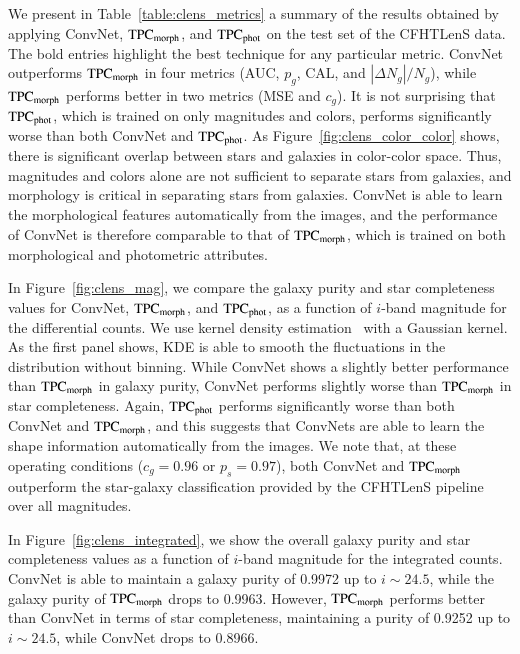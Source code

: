 \documentclass[fleqn,usenatbib]{mnras}
\begin{document}
We present in Table~\ref{table:clens_metrics} a summary of the results obtained
by applying ConvNet, ${\mathrm{TPC}}_{{\mathrm{morph}}}$, and ${\mathrm{TPC}}_{{\mathrm{phot}}}$
on the test set of the CFHTLenS data.
The bold entries highlight the best technique for any particular metric.
ConvNet outperforms ${\mathrm{TPC}}_{{\mathrm{morph}}}$ in four metrics (AUC, $p_g$, CAL,
and $|\Delta N_g|/N_g$), while ${\mathrm{TPC}}_{{\mathrm{morph}}}$ performs better in
two metrics (MSE and $c_g$).
It is not surprising that ${\mathrm{TPC}}_{{\mathrm{phot}}}$, which is trained on only
magnitudes and colors, performs significantly worse than both ConvNet and
${\mathrm{TPC}}_{{\mathrm{phot}}}$.
As Figure~\ref{fig:clens_color_color} shows, there is significant overlap
between stars and galaxies in color-color space.
Thus, magnitudes and colors alone are not sufficient to separate stars from
galaxies,
and morphology is critical in separating stars from galaxies.
ConvNet is able to learn the morphological features automatically from
the images, and the performance of ConvNet is therefore comparable to
that of ${\mathrm{TPC}}_{{\mathrm{morph}}}$,
which is trained on both morphological and photometric attributes.

In Figure~\ref{fig:clens_mag}, we compare the galaxy purity
and star completeness values for ConvNet, ${\mathrm{TPC}}_{{\mathrm{morph}}}$, and
${\mathrm{TPC}}_{{\mathrm{phot}}}$, as a function of  $i$-band magnitude
for the differential counts.
We use  kernel density estimation~\citep[KDE;][]{silverman1986density}
with a Gaussian kernel.
As the first panel shows, KDE is able to smooth the fluctuations in the distribution
without binning.
While ConvNet shows a slightly better performance than ${\mathrm{TPC}}_{{\mathrm{morph}}}$
in galaxy purity,
ConvNet performs slightly worse than ${\mathrm{TPC}}_{{\mathrm{morph}}}$ in star completeness.
Again, ${\mathrm{TPC}}_{{\mathrm{phot}}}$ performs significantly worse than both
ConvNet and ${\mathrm{TPC}}_{{\mathrm{morph}}}$, and this suggests that ConvNets are able to learn
the shape information automatically from the images.
We note that, at these operating conditions ($c_g=0.96$ or $p_s=0.97$),
both ConvNet and ${\mathrm{TPC}}_{{\mathrm{morph}}}$ outperform the
star-galaxy classification provided by
the CFHTLenS pipeline~\citep{hildebrandt2012cfhtlens} over all magnitudes.

In Figure~\ref{fig:clens_integrated}, we show the overall galaxy purity
and star completeness values as a function of $i$-band magnitude for the
integrated counts.
ConvNet is able to maintain a galaxy purity of 0.9972 up to $i\sim24.5$,
while the galaxy purity of ${\mathrm{TPC}}_{{\mathrm{morph}}}$ drops to 0.9963.
However, ${\mathrm{TPC}}_{{\mathrm{morph}}}$ performs better than ConvNet
in terms of star completeness, maintaining a purity of 0.9252 up to
$i\sim24.5$, while ConvNet drops to 0.8966.
\end{document}
